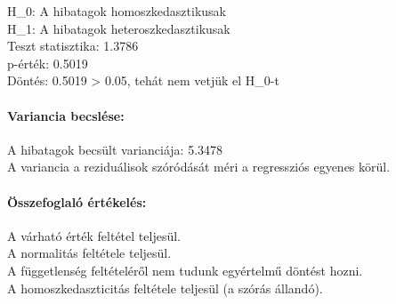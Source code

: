 \documentclass[11pt]{article}
\begin{document}
H\_0: A hibatagok homoszkedasztikusak\\
H\_1: A hibatagok heteroszkedasztikusak\\
Teszt statisztika: 1.3786\\
p-érték: 0.5019\\
Döntés: 0.5019 \textgreater{} 0.05, tehát nem vetjük el H\_0-t

\paragraph{Variancia becslése:}\label{variancia-becsluxe9se}

A hibatagok becsült varianciája: 5.3478\\
A variancia a reziduálisok szóródását méri a regressziós egyenes körül.

\paragraph{Összefoglaló
értékelés:}\label{uxf6sszefoglaluxf3-uxe9rtuxe9keluxe9s}

A várható érték feltétel teljesül.\\
A normalitás feltétele teljesül.\\
A függetlenség feltételéről nem tudunk egyértelmű döntést hozni.\\
A homoszkedaszticitás feltétele teljesül (a szórás állandó).


    
    
    
\end{document}
